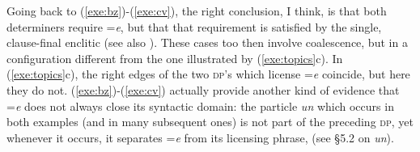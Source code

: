 \documentclass[output=paper,
modfonts
]{LSP/langsci}
\begin{document}
 Going back to (\ref{exe:bz})-(\ref{exe:cv}), the right conclusion, I think, is that both determiners require =\emph{e}, but that that 
 requirement is satisfied by the single, clause-final enclitic (see also \citealt{skopeteas2010}). 
 These cases too then involve coalescence, but in a configuration 
 different from  the one illustrated by (\ref{exe:topics}c). In (\ref{exe:topics}c), the right edges of the two \textsc{dp}'s which license
 =\emph{e} coincide, but here they do not. (\ref{exe:bz})-(\ref{exe:cv}) actually provide another kind of evidence that  =\emph{e} does not
 always close its syntactic domain: the particle \emph{un} which occurs in both examples (and in many subsequent ones) is not part of the preceding \textsc{dp}, yet
whenever it occurs, it separates =\emph{e} from its licensing phrase, (see \S5.2 on \emph{un}).
\end{document}
